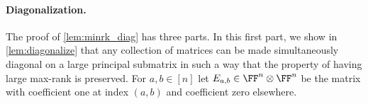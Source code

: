 




\paragraph{Diagonalization.}
The proof of \autoref{lem:minrk_diag} has three parts.
In this first part, we show in \autoref{lem:diagonalize} that any collection of matrices can be made simultaneously diagonal on a large principal submatrix in such a way that the property of having large max-rank is preserved. 
For $a,b \in [n]$ let $E_{a,b} \in \FF^n \otimes \FF^n$ be the matrix with coefficient one at index $(a,b)$ and coefficient zero elsewhere.

